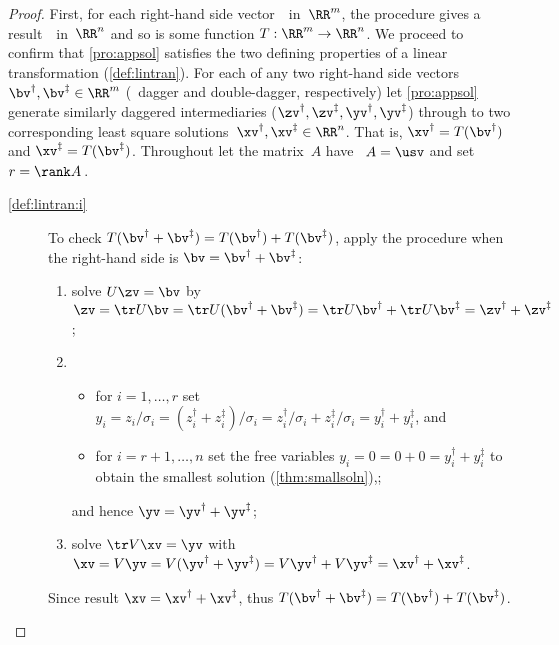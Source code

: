 \begin{proof} 
First, for each right-hand side vector~\bv\ in~\(\RR^m\), the procedure gives a result~\xv\ in~\(\RR^n\) and so is some function \(T:\RR^m\to\RR^n\).
We proceed to confirm that \cref{pro:appsol} satisfies the two defining properties of a linear transformation (\cref{def:lintran}).
For each of any two right-hand side vectors \(\bv^\dag,\bv^\ddag\in\RR^m\) (\bv\ dagger and double-dagger, respectively) let \cref{pro:appsol} generate similarly daggered intermediaries (\(\zv^\dag,\zv^\ddag,\yv^\dag,\yv^\ddag\)) through to two corresponding least square solutions~\(\xv^\dag,\xv^\ddag\in\RR^n\).
That is, \(\xv^\dag=T(\bv^\dag)\) and \(\xv^\ddag=T(\bv^\ddag)\).
Throughout let the matrix~\(A\) have \svd\ \(A=\usv\) and set \(r=\rank A\)\,.
\begin{description}
\item[\ref{def:lintran:i}]  
To check \(T(\bv^\dag+\bv^\ddag)=T(\bv^\dag)+T(\bv^\ddag)\), apply the procedure when the right-hand side is \(\bv=\bv^\dag+\bv^\ddag\):
\begin{enumerate}
\item solve \(U\zv=\bv\) by \(\zv=\tr U\bv=\tr U(\bv^\dag+\bv^\ddag)=\tr U\bv^\dag+\tr U\bv^\ddag=\zv^\dag+\zv^\ddag\);
\item \begin{itemize}
\item for \(i=1,\ldots,r\) set \(y_i=z_i/\sigma_i=(z^\dag_i+z^\ddag_i)/\sigma_i=z^\dag_i/\sigma_i+z^\ddag_i/\sigma_i=y^\dag_i+y^\ddag_i\), and
\item for \(i=r+1,\ldots,n\) set the free variables \(y_i=0=0+0=y^\dag_i+y^\ddag_i\) to obtain the smallest solution (\cref{thm:smallsoln}),;
\end{itemize}
and hence \(\yv=\yv^\dag+\yv^\ddag\);
\item solve \(\tr V\xv=\yv\) with \(\xv=V\yv=V(\yv^\dag+\yv^\ddag)=V\yv^\dag+V\yv^\ddag=\xv^\dag+\xv^\ddag\).
\end{enumerate}
Since result \(\xv=\xv^\dag+\xv^\ddag\), thus \(T(\bv^\dag+\bv^\ddag)=T(\bv^\dag)+T(\bv^\ddag)\).


\end{description}
\end{proof}
